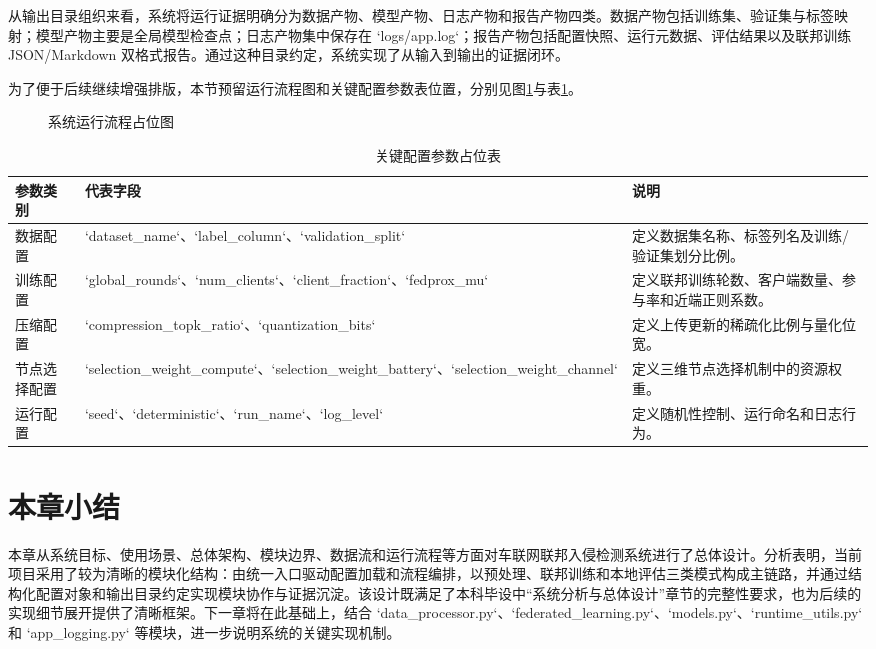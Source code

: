 从输出目录组织来看，系统将运行证据明确分为数据产物、模型产物、日志产物和报告产物四类。数据产物包括训练集、验证集与标签映射；模型产物主要是全局模型检查点；日志产物集中保存在 `logs/app.log`；报告产物包括配置快照、运行元数据、评估结果以及联邦训练 JSON/Markdown 双格式报告。通过这种目录约定，系统实现了从输入到输出的证据闭环。

为了便于后续继续增强排版，本节预留运行流程图和关键配置参数表位置，分别见图\ref{fig:workflow-placeholder}与表\ref{tab:config-placeholder}。

\begin{figure}[htbp]
    \centering
    \caption{系统运行流程占位图}
    \label{fig:workflow-placeholder}
\end{figure}

\begin{table}[htbp]
    \centering
    \caption{关键配置参数占位表}
    \label{tab:config-placeholder}
    \begin{tabular}{p{3.2cm}p{3.2cm}p{6.4cm}}
        \toprule
        参数类别 & 代表字段 & 说明 \\
        \midrule
        数据配置 & `dataset\_name`、`label\_column`、`validation\_split` & 定义数据集名称、标签列名及训练/验证集划分比例。 \\
        训练配置 & `global\_rounds`、`num\_clients`、`client\_fraction`、`fedprox\_mu` & 定义联邦训练轮数、客户端数量、参与率和近端正则系数。 \\
        压缩配置 & `compression\_topk\_ratio`、`quantization\_bits` & 定义上传更新的稀疏化比例与量化位宽。 \\
        节点选择配置 & `selection\_weight\_compute`、`selection\_weight\_battery`、`selection\_weight\_channel` & 定义三维节点选择机制中的资源权重。 \\
        运行配置 & `seed`、`deterministic`、`run\_name`、`log\_level` & 定义随机性控制、运行命名和日志行为。 \\
        \bottomrule
    \end{tabular}
\end{table}

\section{本章小结}
\label{sec:system-design-summary}

本章从系统目标、使用场景、总体架构、模块边界、数据流和运行流程等方面对车联网联邦入侵检测系统进行了总体设计。分析表明，当前项目采用了较为清晰的模块化结构：由统一入口驱动配置加载和流程编排，以预处理、联邦训练和本地评估三类模式构成主链路，并通过结构化配置对象和输出目录约定实现模块协作与证据沉淀。该设计既满足了本科毕设中“系统分析与总体设计”章节的完整性要求，也为后续的实现细节展开提供了清晰框架。下一章将在此基础上，结合 `data\_processor.py`、`federated\_learning.py`、`models.py`、`runtime\_utils.py` 和 `app\_logging.py` 等模块，进一步说明系统的关键实现机制。
